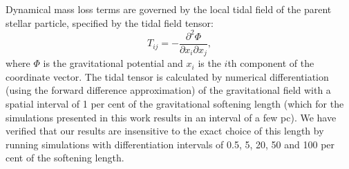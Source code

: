 \documentclass[fleqn,usenatbib]{mnras}
\begin{document}
Dynamical mass loss terms are governed by the local tidal field of the parent stellar particle, specified by the tidal field tensor:
\begin{equation} \label{eq:tidalTensor}
T_{ij} = - \frac{ \partial^2 \Phi }{ \partial x_i \partial x_j } ,
\end{equation}
where $\Phi$ is the gravitational potential and $x_i$ is the $i$th component of the coordinate vector.
The tidal tensor is calculated by numerical differentiation (using the forward difference approximation) of the gravitational field with a spatial interval of 1 per cent of the gravitational softening length (which for the simulations presented in this work results in an interval of a few pc). We have verified that our results are insensitive to the exact choice of this length by running simulations with differentiation intervals of 0.5, 5, 20, 50 and 100 per cent of the softening length.
\end{document}
